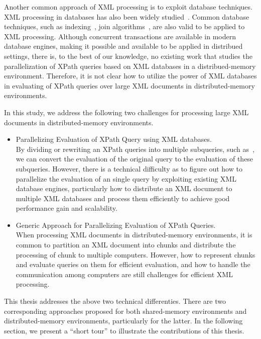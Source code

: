 Another common approach of XML processing is to exploit database techniques. XML
processing in databases has also been widely studied~\cite{fong2001converting,
	meier2002exist, jagadish2002timber,jiang2002xparent,PCSS04}. Common database
techniques, such as indexing~\cite{kha2001xml, wang2005sequencing,
	popovici2005sirius}, join algorithms~\cite{liang2005lax,liang2006slax,
	guha2003index}, are also valid to be applied to XML processing. Although
concurrent transactions are available in modern database engines, making it
possible and available to be applied in distribued settings, there is, to the
best of our knowledge, no existing work that studies the parallelization of
XPath queries based on XML databases in a distribued-memory environment.
Therefore, it is not clear how to utilize the power of XML databases in
evaluating of XPath queries over large XML documents in distributed-memory
environments.

In this study, we address the following two challenges for processing large
XML documents in distributed-memory environments.

\begin{itemize} 
	\item Parallelizing Evaluation of XPath Query using XML databases.\\  
	By dividing or rewriting an XPath queries into multiple subqueries, such
	as~\cite{BoLS09,Bord10},  we can convert the evaluation of the original query to
	the evaluation of these subqueries. However, there is a technical difficulty as
	to figure out how to parallelize the evaluation of an single query by exploiting
	existing XML database engines, particularly how to distribute an XML document to 
	multiple XML databases and process them efficiently to achieve good 
	performance gain and scalability.
	
	\item Generic Approach for Parallelizing Evaluation of XPath Queries.\\
	When processing XML documents in distributed-memory environments, it is common
	to partition an XML document into chunks and distribute the processing of chunk
	to multiple computers. However, how to represent chunks and evaluate queries on
	them for efficient evaluation, and how to handle the communication among
	computers are still challenges for efficient XML processing. \end{itemize}

This thesis addresses the above two technical differenties. There are two
corresponding approaches proposed for both shared-memory environments and
distributed-memory environments, particularly for the latter. In the following
section, we present a ``short tour'' to illustrate the contributions of this
thesis.


